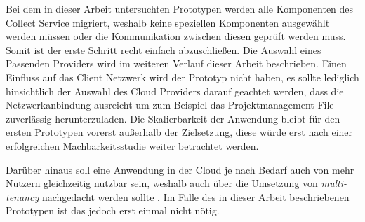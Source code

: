 Bei dem in dieser Arbeit untersuchten Prototypen werden alle Komponenten des Collect Service migriert, weshalb keine speziellen Komponenten ausgewählt werden müssen oder die Kommunikation zwischen diesen geprüft werden muss. Somit ist der erste Schritt recht einfach abzuschließen. Die Auswahl eines Passenden Providers wird im weiteren Verlauf dieser Arbeit beschrieben. Einen Einfluss auf das Client Netzwerk wird der Prototyp nicht haben, es sollte lediglich hinsichtlich der Auswahl des Cloud Providers darauf geachtet werden, dass die Netzwerkanbindung ausreicht um zum Beispiel das Projektmanagement-File zuverlässig herunterzuladen. Die Skalierbarkeit der Anwendung bleibt für den ersten Prototypen vorerst außerhalb der Zielsetzung, diese würde erst nach einer erfolgreichen Machbarkeitsstudie weiter betrachtet werden.

Darüber hinaus soll eine Anwendung in der Cloud je nach Bedarf auch von mehr Nutzern gleichzeitig nutzbar sein, weshalb auch über die Umsetzung von \textit{multi-tenancy} nachgedacht werden sollte \cite[Vgl.][S. 34ff]{Maenhaut2016}. Im Falle des in dieser Arbeit beschriebenen Prototypen ist das jedoch erst einmal nicht nötig.
\pagebreak